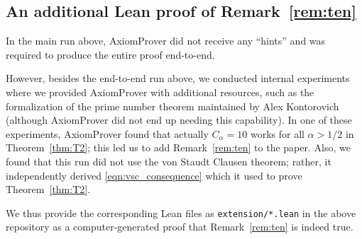 \documentclass[12pt]{amsart}
\theoremstyle{plain}
\theoremstyle{definition}
\begin{document}
\subsection*{An additional Lean proof of Remark~\ref{rem:ten}}
In the main run above, AxiomProver did not receive any ``hints''
and was required to produce the entire proof end-to-end.

However, besides the end-to-end run above, we conducted internal experiments
where we provided AxiomProver with additional resources,
such as the formalization of the prime number theorem
maintained by Alex Kontorovich \cite{KontrovichPNT}
(although AxiomProver did not end up needing this capability).
In one of these experiments, AxiomProver found that
actually $C_{\alpha} = 10$ works for all $\alpha > 1/2$ in Theorem~\ref{thm:T2};
this led us to add Remark~\ref{rem:ten} to the paper.
Also, we found that this run did not use the von Staudt Clausen theorem;
rather, it independently derived  \eqref{eqn:vsc_consequence} which it used to prove Theorem~\ref{thm:T2}.

We thus provide the corresponding Lean files as \texttt{extension/*.lean} in the above repository
as a computer-generated proof that Remark~\ref{rem:ten} is indeed true.
\end{document}
